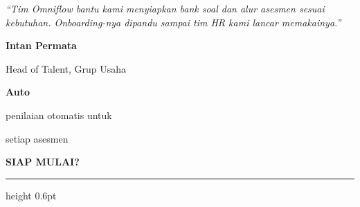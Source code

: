 \documentclass[a4paper]{article}
\newcommand{\sectiontitle}[1]{%
    \vspace{10pt}%
    {\fontsize{13}{16}\selectfont\bfseries\color{BlueDark} #1}\par\vspace{3pt}%
    {\color{BluePrimary}\hrule height 0.6pt}\par\vspace{8pt}%
}
\begin{document}
\noindent
\begin{minipage}[t]{0.485\textwidth}
    \colorbox{BlueBg}{%
        \begin{minipage}{\dimexpr\linewidth-2\fboxsep\relax}
            {\fontsize{9.5}{13}\selectfont\color{TextDark}\textit{``Tim Omniflow bantu kami menyiapkan bank soal dan alur asesmen sesuai kebutuhan. Onboarding-nya dipandu sampai tim HR kami lancar memakainya.''}}\par\vspace{4pt}
            {\fontsize{8.5}{11}\selectfont\bfseries\color{BluePrimary} Intan Permata}\par
            {\fontsize{8}{10}\selectfont\color{TextLight} Head of Talent, Grup Usaha}
        \end{minipage}}
\end{minipage}%
\hfill
\begin{minipage}[t]{0.485\textwidth}
    \colorbox{BlueBg}{%
        \begin{minipage}{\dimexpr\linewidth-2\fboxsep\relax}
            \begin{center}
                {\fontsize{20}{24}\selectfont\bfseries\color{BluePrimary} Auto}\par
                {\fontsize{9.5}{12}\selectfont\color{TextDark} penilaian otomatis untuk}\par
                {\fontsize{9.5}{12}\selectfont\color{TextDark} setiap asesmen}
            \end{center}
        \end{minipage}}
\end{minipage}

\sectiontitle{SIAP MULAI?}
\end{document}
